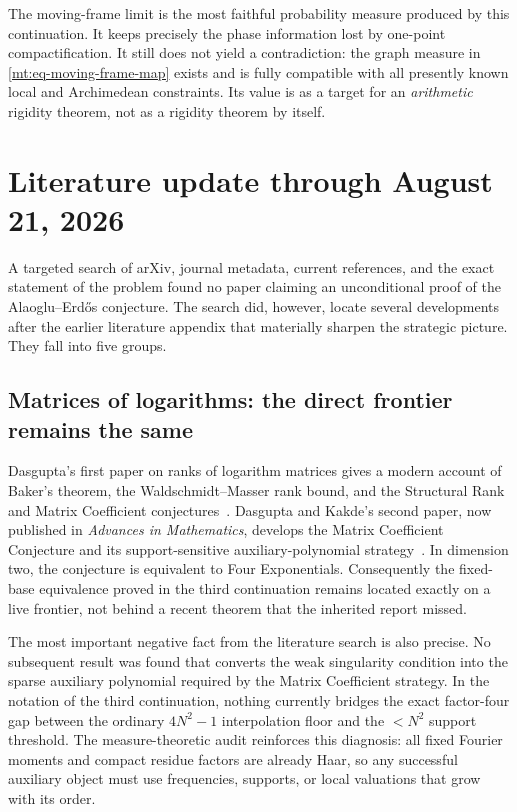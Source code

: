 \documentclass[11pt,oneside]{article}
\theoremstyle{definition}
\theoremstyle{remark}
\begin{document}
The moving-frame limit is the most faithful probability measure produced by this continuation.
It keeps precisely the phase information lost by one-point compactification.  It still does
not yield a contradiction: the graph measure in \eqref{mt:eq-moving-frame-map} exists and is
fully compatible with all presently known local and Archimedean constraints.  Its value is as
a target for an \emph{arithmetic} rigidity theorem, not as a rigidity theorem by itself.

\section{Literature update through August 21, 2026}
\label{mt:sec-literature-update}

A targeted search of arXiv, journal metadata, current references, and the exact statement of
the problem found no paper claiming an unconditional proof of the Alaoglu--Erd\H{o}s
conjecture.  The search did, however, locate several developments after the earlier literature
appendix that materially sharpen the strategic picture.  They fall into five groups.

\subsection{Matrices of logarithms: the direct frontier remains the same}

Dasgupta's first paper on ranks of logarithm matrices gives a modern account of Baker's theorem,
the Waldschmidt--Masser rank bound, and the Structural Rank and Matrix Coefficient
conjectures~\cite{DasguptaRanksI}.  Dasgupta and Kakde's second paper, now published in
\emph{Advances in Mathematics}, develops the Matrix Coefficient Conjecture and its
support-sensitive auxiliary-polynomial strategy~\cite{DasguptaKakdeMCC}.  In dimension two,
the conjecture is equivalent to Four Exponentials.  Consequently the fixed-base equivalence
proved in the third continuation remains located exactly on a live frontier, not behind a
recent theorem that the inherited report missed.

The most important negative fact from the literature search is also precise.  No subsequent
result was found that converts the weak singularity condition into the sparse auxiliary
polynomial required by the Matrix Coefficient strategy.  In the notation of the third
continuation, nothing currently bridges the exact factor-four gap between the ordinary
$4N^2-1$ interpolation floor and the $<N^2$ support threshold.  The measure-theoretic audit
reinforces this diagnosis: all fixed Fourier moments and compact residue factors are already
Haar, so any successful auxiliary object must use frequencies, supports, or local valuations
that grow with its order.
\end{document}
